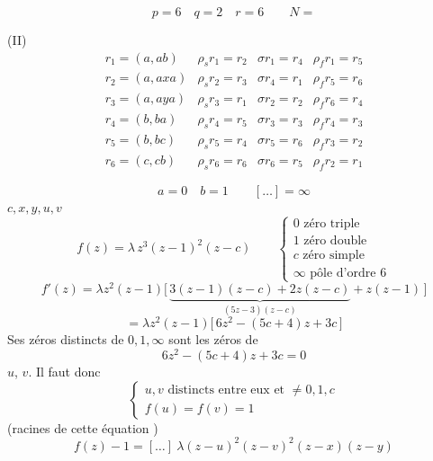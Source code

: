 \documentclass[11pt,a4paper]{article}
\begin{document}
\[
  p = 6 \quad q = 2 \quad r = 6 \qquad N =
\]

(II)
\[
  \begin{array}{llll}
  r_1 = (a, ab) & \rho_s r_1 = r_2 & \sigma r_1 = r_4 & \rho_f r_1 = r_5 \\
  r_2 = (a, axa) & \rho_s r_2 = r_3 & \sigma r_4 = r_1 & \rho_f r_5 = r_6 \\
  r_3 = (a, aya) & \rho_s r_3 = r_1 & \sigma r_2 = r_2 & \rho_f r_6 = r_4 \\
  r_4 = (b, ba) & \rho_s r_4 = r_5 & \sigma r_3 = r_3 & \rho_f r_4 = r_3 \\
  r_5 = (b, bc) & \rho_s r_5 = r_4 & \sigma r_5 = r_6 & \rho_f r_3 = r_2 \\
  r_6 = (c, cb) & \rho_s r_6 = r_6 & \sigma r_6 = r_5 & \rho_f r_2 = r_1
  \end{array}
\]


 \quad {} \quad {} \quad {}

 \quad {}


\[
  a = 0 \quad b = 1 \qquad [\ldots] = \infty
\]
 $c, x, y, u, v$
\[
  f(z) = \lambda\, z^3 (z-1)^2 (z-c)
  \qquad
  \begin{cases}
    0 \text{ zéro triple} \\
    1 \text{ zéro double} \\
    c \text{ zéro simple} \\
    \infty \text{ pôle d'ordre } 6
  \end{cases}
\]
\[
  f'(z) = \lambda z^2(z-1)\bigl[\,\underbrace{3(z-1)(z-c) + 2z(z-c)}_{(5z-3)(z-c)} + z(z-1)\,\bigr]
\]
\[
  = \lambda z^2 (z-1)\bigl[\,6z^2 - (5c+4)z + 3c\,\bigr]
\]
Ses zéros distincts de $0, 1, \infty$ sont les zéros de
\[
  6z^2 - (5c+4)z + 3c = 0
\]
 $u$, $v$. Il faut donc 
\[
  \begin{cases}
    u, v \text{ distincts entre eux et } \neq 0, 1, c \\
    f(u) = f(v) = 1
  \end{cases}
\]
(racines \ill{} de cette équation )
\[
  f(z) - 1 = [\ldots]\ \lambda (z-u)^2 (z-v)^2 (z-x)(z-y)
\]
\end{document}

